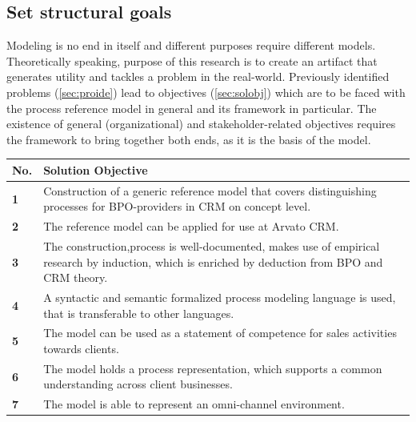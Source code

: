 	\subsection{Set structural goals}
	
	Modeling is no end in itself and different purposes require different models. Theoretically speaking, purpose of this research is to create an artifact that generates utility and tackles a problem in the real-world.  Previously identified problems (\ref{sec:proide}) lead to objectives (\ref{sec:solobj}) which are to be faced with the process reference model in general and its framework in particular. The existence of general (organizational) and stakeholder-related objectives requires the framework to bring together both ends, as it is the basis of the model. 
	
	\begin{table}[caption={Solution Objectives}, label={tab:solobj}]
		\centering
		\begin{tabular}{l p{13.3cm}}

			\textbf{No. }&\textbf{ Solution Objective}
			 \\ \hline
			\textbf{1 }                        & Construction of a generic reference model that covers distinguishing processes for BPO-providers in CRM on concept level.                                                    \\ \hline
			\textbf{2}                         & The reference model can be applied for use at Arvato CRM.                                                                                                                    \\ \hline
			\textbf{3 }                        & The construction,process is well-documented, makes use of empirical research by induction, which is enriched by deduction from \acrshort{BPO} and \acrshort{CRM} theory. \\ \hline
			\textbf{4}                         & A syntactic and semantic formalized process modeling language is used, that is transferable to other languages.                                                              \\ \hline
			\textbf{5}                         & The model can be used as a statement of competence for sales activities towards clients.                                                                                     \\ \hline
			\textbf{6}                         & The model holds a process representation, which supports a common understanding across client businesses.                                                                    \\ \hline
			\textbf{7}                         & The model is able to represent an omni-channel environment.                                                                                                                 
		\end{tabular}
	\end{table}


